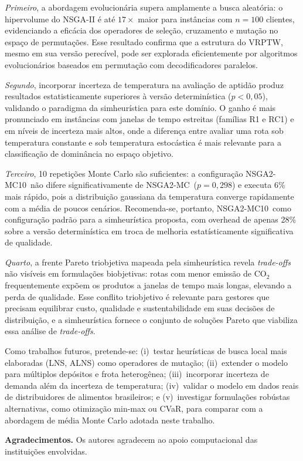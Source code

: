 \documentclass[a4paper,11pt]{article}
\newcommand{\nsmc}{NSGA2\mbox{-}MC\xspace}
\newcommand{\nsmx}{NSGA2\mbox{-}MC10\xspace}
\begin{document}
\textit{Primeiro}, a abordagem evolucionária supera amplamente a busca aleatória:
o hipervolume do NSGA-II é até $17\times$ maior para inst\^ancias com $n=100$
clientes, evidenciando a eficácia dos operadores de seleção, cruzamento e
mutação no espaço de permutações.
Esse resultado confirma que a estrutura do VRPTW, mesmo em sua versão
perecível, pode ser explorada eficientemente por algoritmos evolucionários
baseados em permutação com decodificadores paralelos.

\textit{Segundo}, incorporar incerteza de temperatura na avaliação de
aptidão produz resultados estatisticamente superiores à versão
determinística ($p < 0{,}05$), validando o paradigma da simheurística
para este domínio.
O ganho é mais pronunciado em inst\^ancias com janelas de tempo estreitas
(famílias R1 e RC1) e em níveis de incerteza mais altos, onde a
diferença entre avaliar uma rota sob temperatura constante e sob
temperatura estocástica é mais relevante para a classificação de
domin\^ancia no espaço objetivo.

\textit{Terceiro}, 10 repetições Monte Carlo são suficientes: a
configuração \nsmx~não difere significativamente de \nsmc~($p = 0{,}298$)
e executa 6\% mais rápido, pois a distribuição gaussiana da temperatura
converge rapidamente com a média de poucos cenários.
Recomenda-se, portanto, \nsmx~como configuração padrão para a simheurística
proposta, com overhead de apenas 28\% sobre a versão determinística
em troca de melhoria estatísticamente significativa de qualidade.

\textit{Quarto}, a frente Pareto triobjetiva mapeada pela simheurística revela
\textit{trade-offs} não visíveis em formulações biobjetivas:
rotas com menor emissão de CO$_2$ frequentemente expõem os produtos a
janelas de tempo mais longas, elevando a perda de qualidade.
Esse conflito triobjetivo é relevante para gestores que precisam equilibrar
custo, qualidade e sustentabilidade em suas decisões de distribuição,
e a simheurística fornece o conjunto de soluções Pareto que viabiliza
essa análise de \textit{trade-offs}.

Como trabalhos futuros, pretende-se: (i)~testar heurísticas de busca local
mais elaboradas (LNS, ALNS) como operadores de mutação; (ii)~extender o
modelo para múltiplos depósitos e frota heterog\^enea; (iii)~incorporar
incerteza de demanda além da incerteza de temperatura;
(iv)~validar o modelo em dados reais de distribuidores de alimentos brasileiros;
e (v)~investigar formulações robústas alternativas, como otimização
min-max ou CVaR, para comparar com a abordagem de média Monte Carlo
adotada neste trabalho.

\bigskip
\noindent\textbf{Agradecimentos.}
Os autores agradecem ao apoio computacional das instituições envolvidas.

~\\


\end{document}
